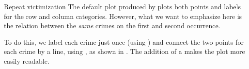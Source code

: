 \documentclass[11pt]{book}
\renewenvironment{knitrout}{\small\renewcommand{\baselinestretch}{.85}}{} %
\begin{document}
\begin{Example}[victims2]{Repeat victimization}
The default plot produced by 
plots both points and labels for the row and column categories.
However, what we want to emphasize here is the relation between
the \emph{same} crimes on the first and second occurrence.

To do this, we  label each crime just once (using )
and connect the two points for each crime by a line,
using , as shown in .
The addition of a  makes the plot more easily readable.

\begin{knitrout}
\color{fgcolor}\begin{kframe}
\begin{alltt}
 \hlkwb{<-} \hlstd{(}\hlstd{=}\hlstd{,} \hlstd{=}\hlstd{(}\hlstd{,}\hlstd{,}\hlstd{,}\hlstd{)}\hlopt{+}\hlstd{)}
 \hlkwb{<-}  \hlstd{=}\hlstd{(}\hlstd{,}\hlstd{))}
\hlopt{$}\hlstd{rows[,}\hlstd{], res}\hlopt{$}\hlstd{rows[,}\hlstd{], res}\hlopt{$}\hlstd{cols[,}\hlstd{], res}\hlopt{$}\hlstd{cols[,}\hlstd{])}
\hlstd{(}\hlopt{-}\hlstd{,} \hlstd{,} \hlstd{(}\hlstd{,} \hlstd{),} \hlstd{=}\hlstd{,}
       \hlstd{=}\hlstd{(}\hlstd{,} \hlstd{),} \hlstd{=}\hlopt{:}\hlstd{,} \hlstd{=}\hlstd{)}
\end{alltt}
\end{kframe}\begin{figure}[!htb]



\end{figure}
\end{knitrout}
\end{Example}
\end{document}
